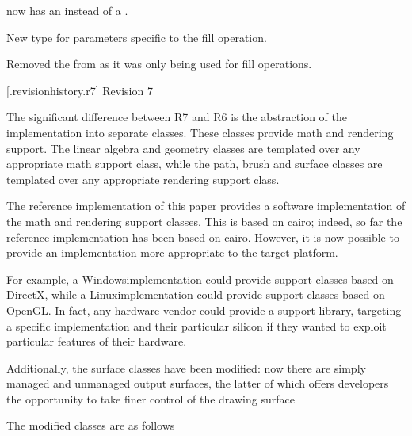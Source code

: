\pnum
{} now has an  instead of a .

\pnum
New type  for parameters specific to the fill operation.

\pnum
Removed the  from  as it was only being used for fill operations.

 [\iotwod.revisionhistory.r7] {Revision 7}

\pnum
The significant difference between R7 and R6 is the abstraction of the implementation into separate classes. These classes provide math and rendering support. The linear algebra and geometry classes are templated over any appropriate math support class, while the path, brush and surface classes are templated over any appropriate rendering support class.

\pnum
The reference implementation of this paper provides a software implementation of the math and rendering support classes. This is based on cairo; indeed, so far the reference implementation has been based on cairo. However, it is now possible to provide an implementation more appropriate to the target platform.

\pnum
For example, a Windows\textregistered implementation could provide support classes based on DirectX\textregistered, while a Linux\textregistered implementation could provide support classes based on OpenGL\textregistered. In fact, any hardware vendor could provide a support library, targeting a specific implementation and their particular silicon if they wanted to exploit particular features of their hardware.

\pnum
Additionally, the surface classes have been modified: now there are simply managed and unmanaged output surfaces, the latter of which offers developers the opportunity to take finer control of the drawing surface

\pnum
The modified classes are as follows

